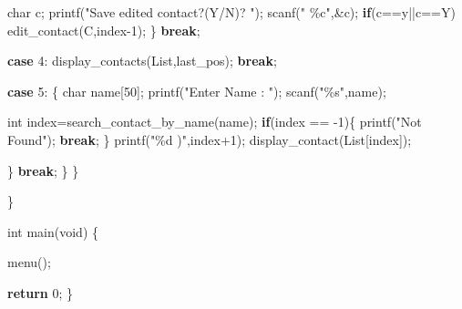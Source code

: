 \documentclass[
]{article}
\newenvironment{Shaded}{}{}
\newcommand{\CharTok}[1]{\textcolor[rgb]{0.25,0.44,0.63}{#1}}
\newcommand{\ControlFlowTok}[1]{\textcolor[rgb]{0.00,0.44,0.13}{\textbf{#1}}}
\newcommand{\DataTypeTok}[1]{\textcolor[rgb]{0.56,0.13,0.00}{#1}}
\newcommand{\DecValTok}[1]{\textcolor[rgb]{0.25,0.63,0.44}{#1}}
\newcommand{\NormalTok}[1]{#1}
\newcommand{\OperatorTok}[1]{\textcolor[rgb]{0.40,0.40,0.40}{#1}}
\newcommand{\StringTok}[1]{\textcolor[rgb]{0.25,0.44,0.63}{#1}}
\begin{document}
\begin{Shaded}
\begin{Highlighting}[]
                        \DataTypeTok{char}\NormalTok{ c}\OperatorTok{;}
\NormalTok{                        printf}\OperatorTok{(}\StringTok{"Save edited contact?(Y/N)? "}\OperatorTok{);}
\NormalTok{                        scanf}\OperatorTok{(}\StringTok{" \%c"}\OperatorTok{,\&}\NormalTok{c}\OperatorTok{);}
                        \ControlFlowTok{if}\OperatorTok{(}\NormalTok{c}\OperatorTok{==}\CharTok{\textquotesingle{}y\textquotesingle{}}\OperatorTok{||}\NormalTok{c}\OperatorTok{==}\CharTok{\textquotesingle{}Y\textquotesingle{}}\OperatorTok{)}
\NormalTok{                            edit\_contact}\OperatorTok{(}\NormalTok{C}\OperatorTok{,}\NormalTok{index}\OperatorTok{{-}}\DecValTok{1}\OperatorTok{);}
                    \OperatorTok{\}}
                    \ControlFlowTok{break}\OperatorTok{;}

            \ControlFlowTok{case} \DecValTok{4}\OperatorTok{:}\NormalTok{ display\_contacts}\OperatorTok{(}\NormalTok{List}\OperatorTok{,}\NormalTok{last\_pos}\OperatorTok{);}
                    \ControlFlowTok{break}\OperatorTok{;}

            \ControlFlowTok{case} \DecValTok{5}\OperatorTok{:} \OperatorTok{\{}
                        \DataTypeTok{char}\NormalTok{ name}\OperatorTok{[}\DecValTok{50}\OperatorTok{];}
\NormalTok{                        printf}\OperatorTok{(}\StringTok{"Enter Name : "}\OperatorTok{);}
\NormalTok{                        scanf}\OperatorTok{(}\StringTok{"\%s"}\OperatorTok{,}\NormalTok{name}\OperatorTok{);}

                        \DataTypeTok{int}\NormalTok{ index}\OperatorTok{=}\NormalTok{search\_contact\_by\_name}\OperatorTok{(}\NormalTok{name}\OperatorTok{);}
                        \ControlFlowTok{if}\OperatorTok{(}\NormalTok{index }\OperatorTok{==} \OperatorTok{{-}}\DecValTok{1}\OperatorTok{)\{}
\NormalTok{                            printf}\OperatorTok{(}\StringTok{"Not Found"}\OperatorTok{);}
                            \ControlFlowTok{break}\OperatorTok{;}
                        \OperatorTok{\}}
\NormalTok{                        printf}\OperatorTok{(}\StringTok{"\%d )"}\OperatorTok{,}\NormalTok{index}\OperatorTok{+}\DecValTok{1}\OperatorTok{);}
\NormalTok{                        display\_contact}\OperatorTok{(}\NormalTok{List}\OperatorTok{[}\NormalTok{index}\OperatorTok{]);}

                    \OperatorTok{\}} 
                    \ControlFlowTok{break}\OperatorTok{;}
        \OperatorTok{\}}
    \OperatorTok{\}}

\OperatorTok{\}}

\DataTypeTok{int}\NormalTok{ main}\OperatorTok{(}\DataTypeTok{void}\OperatorTok{)} \OperatorTok{\{}

\NormalTok{    menu}\OperatorTok{();}

    \ControlFlowTok{return} \DecValTok{0}\OperatorTok{;}
\OperatorTok{\}}
\end{Highlighting}
\end{Shaded}
\end{document}
